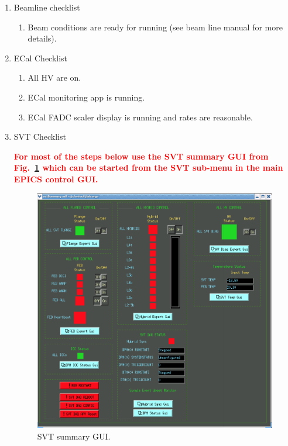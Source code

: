 \documentclass[12pt]{article}
\begin{document}
\begin{enumerate}
\item
Beamline checklist
\begin{enumerate}
\item
Beam conditions are ready for running (see beam line manual for more details).
\end{enumerate}
\item    ECal Checklist
\begin{enumerate}
\item
All HV are on.
\item
ECal monitoring app is running.
\item
ECal FADC scaler display is running and rates are reasonable.
\end{enumerate}
\item
\label{item:svt-checklist}
SVT Checklist \newline

{\bf \textcolor{red}{
For most of the steps below use the SVT summary GUI from Fig.~\ref{fig:svt_summary_gui} which can be started from the SVT sub-menu in the 
main EPICS control GUI.}}
\begin{figure}[htbp]
\begin{center}
    \includegraphics[width=\textwidth]{svt_summary_gui.png}
\caption{SVT summary GUI.}
\label{fig:svt_summary_gui}
\end{center}
\vspace*{-5mm}
\end{figure}
\begin{enumerate}


\end{enumerate}
\end{enumerate}
\end{document}
